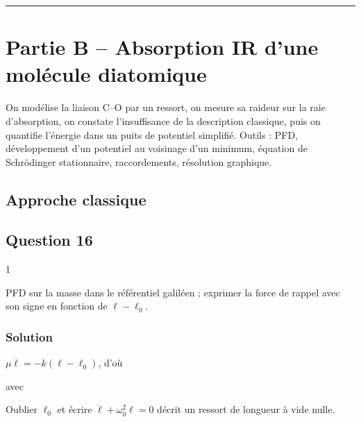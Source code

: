 \documentclass[11pt,a4paper]{article}
\newcommand{\equationajustee}[1]{%
  \sbox{\boiteequation}{$\displaystyle #1$}%
  \ifdim\wd\boiteequation>\linewidth
    \[\resizebox{\linewidth}{!}{\usebox{\boiteequation}}\]%
  \else
    \[#1\]%
  \fi}
\begin{document}
\begin{center}\rule{0.5\linewidth}{0.5pt}\end{center}

\hypertarget{partie-b-absorption-ir-dune-moluxe9cule-diatomique}{%
\section{Partie B -- Absorption IR d'une molécule diatomique}\label{partie-b-absorption-ir-dune-moluxe9cule-diatomique}}

On modélise la liaison C--O par un ressort, on mesure sa raideur sur la raie d'absorption, on constate l'insuffisance de la description classique, puis on quantifie l'énergie dans un puits de potentiel simplifié. Outils : PFD, développement d'un potentiel au voisinage d'un minimum, équation de Schrödinger stationnaire, raccordements, résolution graphique.

\hypertarget{approche-classique}{%
\subsection{Approche classique}\label{approche-classique}}

\hypertarget{question-16}{%
\subsection{Question 16}\label{question-16}}

\begin{indication}{1}

PFD sur la masse dans le référentiel galiléen ; exprimer la force de rappel avec son signe en fonction de \(\ell-\ell_0\).

\end{indication}

\hypertarget{solution-15}{%
\subsubsection{Solution}\label{solution-15}}

\(\mu\ddot\ell = -k(\ell-\ell_0)\), d'où

\equationajustee{\boxed{\ddot\ell + \omega_0^2\,\ell = \omega_0^2\,\ell_0}}

avec

\equationajustee{\boxed{\omega_0 = \sqrt{\frac{k}{\mu}}}}

\begin{piege}

Oublier \(\ell_0\) et écrire \(\ddot\ell + \omega_0^2\ell = 0\) décrit un ressort de longueur à vide nulle.

\end{piege}
\end{document}
